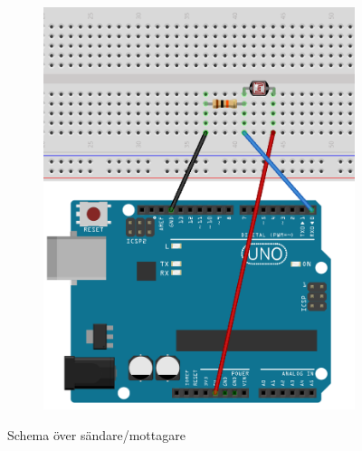 \begin{figure}[h]
\begin{subfigure}[hbt]{0.35\textwidth}
                \includegraphics[width=\textwidth]{res/img/resistor}    
            \end{subfigure}
        \caption{Schema över sändare/mottagare}\label{fig:schem}
        \end{figure}


    
